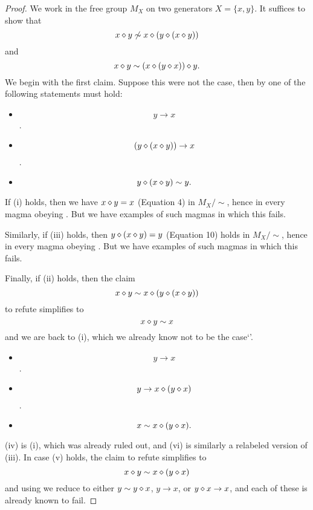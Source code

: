 \begin{proof}
  We work in the free group $M_X$ on two generators $X = \{x,y\}$.  It suffices to show that
$$  x \diamond y \not \sim x \diamond (y \diamond (x \diamond y))$$
and
$$
x \diamond y \sim (x \diamond (y \diamond x)) \diamond y.$$
We begin with the first claim.  Suppose this were not the case, then by  one of the following statements must hold:
\begin{itemize}
\item[(i)] $$y \to x$$.
\item[(ii)] $$(y \diamond (x \diamond y)) \to x$$.
\item[(iii)] $$y \diamond (x \diamond y) \sim y.$$
\end{itemize}
If (i) holds, then we have $x \diamond y = x$ (Equation 4) in $M_X/\sim$, hence in every magma obeying .  But we have examples of such magmas in which this fails.

Similarly, if (iii) holds, then $y \diamond (x \diamond y) = y$ (Equation 10) holds in $M_X/\sim$, hence in every magma obeying .  But we have examples of such magmas in which this fails.

Finally, if (ii) holds, then the claim
$$  x \diamond y \sim x \diamond (y \diamond (x \diamond y))$$
to refute simplifies to
$$  x \diamond y \sim x$$
and we are back to (i), which we already know not to be the case`'.
\begin{itemize}
  \item[(iv)] $$y \to x$$.
  \item[(v)] $$y \to x \diamond (y \diamond x)$$.
  \item[(vi)] $$x \sim x \diamond (y \diamond x).$$
  \end{itemize}
(iv) is (i), which was already ruled out, and (vi) is similarly a relabeled version of (iii). In case (v) holds, the claim to refute simplifies to
$$
x \diamond y \sim x \diamond (y \diamond x)$$
and using  we reduce to either $y \sim y \diamond x$, $y \to x$, or $y \diamond x \to x$, and each of these is already known to fail.
\end{proof}

